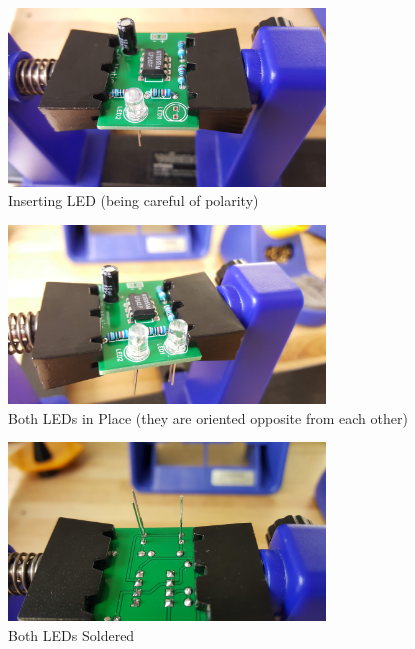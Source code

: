 \documentclass{article}
\begin{document}
\begin{enumerate}
      
\begin{figure}[H]
\caption{ Inserting LED (being careful of polarity) }
\label{fig:img/0045.jpg}
\centering
\includegraphics[width=0.75\textwidth]{img/0045.jpg}
\end{figure}


      
\begin{figure}[H]
\caption{ Both LEDs in Place (they are oriented opposite from each other) }
\label{fig:img/0046.jpg}
\centering
\includegraphics[width=0.75\textwidth]{img/0046.jpg}
\end{figure}

      
\begin{figure}[H]
\caption{ Both LEDs Soldered }
\label{fig:img/0047.jpg}
\centering
\includegraphics[width=0.75\textwidth]{img/0047.jpg}
\end{figure}


\end{enumerate}
\end{document}
